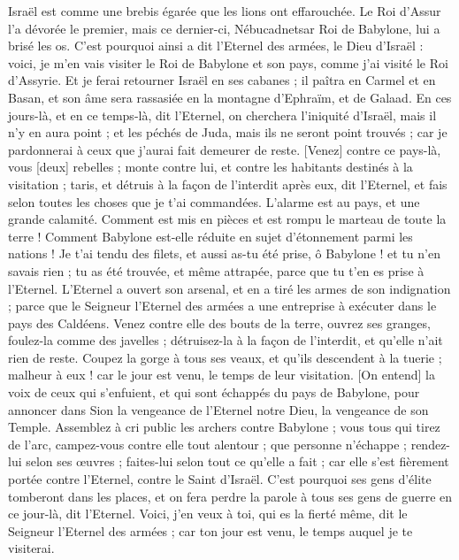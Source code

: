\begin{multicols}{2}
Israël est comme une brebis égarée que les lions ont effarouchée. Le Roi d'Assur l'a dévorée le premier, mais ce dernier-ci, Nébucadnetsar Roi de Babylone, lui a brisé les os.
C'est pourquoi ainsi a dit l'Eternel des armées, le Dieu d'Israël : voici, je m'en vais visiter le Roi de Babylone et son pays, comme j'ai visité le Roi d'Assyrie.
Et je ferai retourner Israël en ses cabanes ; il paîtra en Carmel et en Basan, et son âme sera rassasiée en la montagne d'Ephraïm, et de Galaad.
En ces jours-là, et en ce temps-là, dit l'Eternel, on cherchera l'iniquité d'Israël, mais il n'y en aura point ; et les péchés de Juda, mais ils ne seront point trouvés ; car je pardonnerai à ceux que j'aurai fait demeurer de reste.
[Venez] contre ce pays-là, vous [deux] rebelles ; monte contre lui, et contre les habitants destinés à la visitation ; taris, et détruis à la façon de l'interdit après eux, dit l'Eternel, et fais selon toutes les choses que je t'ai commandées.
L'alarme est au pays, et une grande calamité.
Comment est mis en pièces et est rompu le marteau de toute la terre ! Comment Babylone est-elle réduite en sujet d'étonnement parmi les nations !
Je t'ai tendu des filets, et aussi as-tu été prise, ô Babylone ! et tu n'en savais rien ; tu as été trouvée, et même attrapée, parce que tu t'en es prise à l'Eternel.
L'Eternel a ouvert son arsenal, et en a tiré les armes de son indignation ; parce que le Seigneur l'Eternel des armées a une entreprise à exécuter dans le pays des Caldéens.
Venez contre elle des bouts de la terre, ouvrez ses granges, foulez-la comme des javelles ; détruisez-la à la façon de l'interdit, et qu'elle n'ait rien de reste.
Coupez la gorge à tous ses veaux, et qu'ils descendent à la tuerie ; malheur à eux ! car le jour est venu, le temps de leur visitation.
[On entend] la voix de ceux qui s'enfuient, et qui sont échappés du pays de Babylone, pour annoncer dans Sion la vengeance de l'Eternel notre Dieu, la vengeance de son Temple.
Assemblez à cri public les archers contre Babylone ; vous tous qui tirez de l'arc, campez-vous contre elle tout alentour ; que personne n'échappe ; rendez-lui selon ses œuvres ; faites-lui selon tout ce qu'elle a fait ; car elle s'est fièrement portée contre l'Eternel, contre le Saint d'Israël.
C'est pourquoi ses gens d'élite tomberont dans les places, et on fera perdre la parole à tous ses gens de guerre en ce jour-là, dit l'Eternel.
Voici, j'en veux à toi, qui es la fierté même, dit le Seigneur l'Eternel des armées ; car ton jour est venu, le temps auquel je te visiterai.

\end{multicols}
